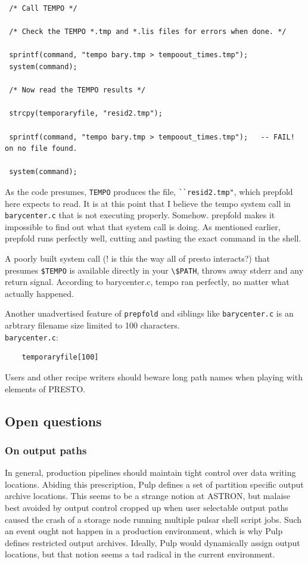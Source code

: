 \documentclass[a4paper,10pt,bibtotoc]{scrartcl}
\begin{document}
\begin{verbatim}
 /* Call TEMPO */                                                

 /* Check the TEMPO *.tmp and *.lis files for errors when done. */ 

 sprintf(command, "tempo bary.tmp > tempoout_times.tmp");        
 system(command);                                                

 /* Now read the TEMPO results */                              

 strcpy(temporaryfile, "resid2.tmp");                           

 sprintf(command, "tempo bary.tmp > tempoout_times.tmp");   -- FAIL! on no file found.

 system(command);
\end{verbatim}

As the code presumes, \verb|TEMPO| produces the file, \verb|``resid2.tmp"|, which 
prepfold here expects to read.  It is at this point that I believe 
the tempo system call in \verb|barycenter.c| that is not executing properly. 
Somehow.  prepfold makes it impossible to find out what that system 
call is doing.  As mentioned earlier, prepfold runs perfectly well, 
cutting and pasting the exact command in the shell.

A poorly built system call (! is this the way all of presto interacts?)
that presumes \verb|$TEMPO| is available directly in your \verb|\$PATH|, throws
away stderr and any return signal. According to barycenter.c, tempo ran 
perfectly, no matter what actually happened.

Another unadvertised feature of \verb|prepfold| and siblings like
\verb|barycenter.c| is an arbtrary filename size limited to 100
characters.\\
\verb|barycenter.c|:
\begin{verbatim}
    temporaryfile[100]
\end{verbatim}
Users and other recipe writers should beware long path names when playing
with elements of PRESTO.

\subsection{Open questions}
\label{sec:open-questions}
\subsubsection{On output paths}
In general, production pipelines should maintain tight control over
data writing locations.  Abiding this prescription, Pulp defines a set
of partition specific output archive locations. This seems to be a
strange notion at ASTRON, but malaise best avoided by output control
cropped up when user selectable output paths caused the crash of a
storage node running multiple pulsar shell script jobs.  Such an event
ought not happen in a production environment, which is why Pulp
defines restricted output archives.  Ideally, Pulp would dynamically
assign output locations, but that notion seems a tad radical in the
current environment.
\end{document}
